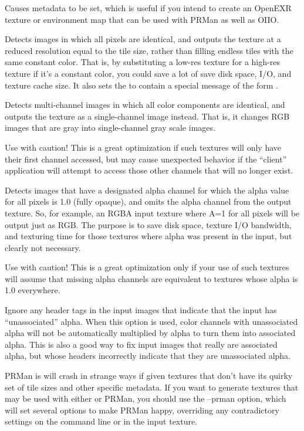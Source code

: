 Causes metadata  to be set, which is useful if
you intend to create an OpenEXR texture or environment map that can be
used with PRMan as well as OIIO.
\apiend

Detects images in which all pixels are identical, and outputs the
texture at a reduced resolution equal to the tile size, rather than
filling endless tiles with the same constant color.  That is, by
substituting a low-res texture for a high-res texture if it's a constant
color, you could save a lot of save disk space, I/O, and texture cache size.
It also sets the  to contain a
special message of the form .  
\apiend

Detects multi-channel images in which all color components are
identical, and outputs the texture as a single-channel image instead.
That is, it changes RGB images that are gray into single-channel gray
scale images.

Use with caution!  This is a great optimization if such textures will
only have their first channel accessed, but may cause unexpected behavior
if the ``client'' application will attempt to access those other
channels that will no longer exist.
\apiend

Detects images that have a designated alpha channel for which the alpha value
for all pixels is 1.0 (fully opaque), and omits the alpha channel from
the output texture.  So, for example, an RGBA input texture where A=1
for all pixels will be output just as RGB.  The purpose is to save disk
space, texture I/O bandwidth, and texturing time for those textures
where alpha was present in the input, but clearly not necessary.

Use with caution!  This is a great optimization only if your use of such
textures will assume that missing alpha channels are equivalent to
textures whose alpha is 1.0 everywhere.
\apiend

Ignore any header tags in the input images that indicate that the
input has ``unassociated'' alpha.  When this option is used, color
channels with unassociated alpha will not be automatically multiplied
by alpha to turn them into associated alpha. This is also a good way
to fix input images that really are associated alpha, but whose headers
incorrectly indicate that they are unassociated alpha. 
\apiend

PRMan is will crash in strange ways if given textures that don't have
its quirky set of tile sizes and other specific metadata.  If you want
\maketx to generate textures that may be used with either \OpenImageIO
or PRMan, you should use the {\cf --prman} option, which will set
several options to make PRMan happy, overriding any contradictory
settings on the command line or in the input texture.  


